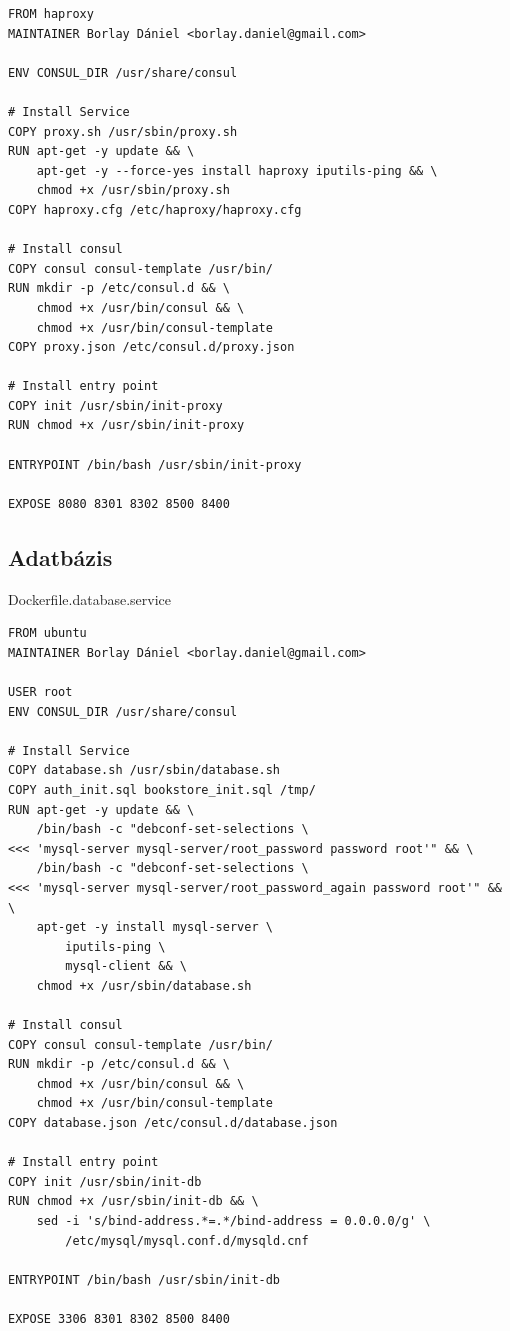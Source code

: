 \documentclass[11pt,magyar,a4paper,twoside,]{report}
\begin{document}
\begin{verbatim}
FROM haproxy
MAINTAINER Borlay Dániel <borlay.daniel@gmail.com>

ENV CONSUL_DIR /usr/share/consul

# Install Service
COPY proxy.sh /usr/sbin/proxy.sh
RUN apt-get -y update && \
    apt-get -y --force-yes install haproxy iputils-ping && \
    chmod +x /usr/sbin/proxy.sh
COPY haproxy.cfg /etc/haproxy/haproxy.cfg

# Install consul
COPY consul consul-template /usr/bin/
RUN mkdir -p /etc/consul.d && \
    chmod +x /usr/bin/consul && \
    chmod +x /usr/bin/consul-template
COPY proxy.json /etc/consul.d/proxy.json

# Install entry point
COPY init /usr/sbin/init-proxy
RUN chmod +x /usr/sbin/init-proxy

ENTRYPOINT /bin/bash /usr/sbin/init-proxy

EXPOSE 8080 8301 8302 8500 8400
\end{verbatim}

\subsection{Adatbázis}\label{adatbuxe1zis}

Dockerfile.database.service

\begin{verbatim}
FROM ubuntu
MAINTAINER Borlay Dániel <borlay.daniel@gmail.com>

USER root
ENV CONSUL_DIR /usr/share/consul

# Install Service
COPY database.sh /usr/sbin/database.sh
COPY auth_init.sql bookstore_init.sql /tmp/
RUN apt-get -y update && \
    /bin/bash -c "debconf-set-selections \
<<< 'mysql-server mysql-server/root_password password root'" && \
    /bin/bash -c "debconf-set-selections \
<<< 'mysql-server mysql-server/root_password_again password root'" && \
    apt-get -y install mysql-server \
        iputils-ping \
        mysql-client && \
    chmod +x /usr/sbin/database.sh

# Install consul
COPY consul consul-template /usr/bin/
RUN mkdir -p /etc/consul.d && \
    chmod +x /usr/bin/consul && \
    chmod +x /usr/bin/consul-template
COPY database.json /etc/consul.d/database.json

# Install entry point
COPY init /usr/sbin/init-db
RUN chmod +x /usr/sbin/init-db && \
    sed -i 's/bind-address.*=.*/bind-address = 0.0.0.0/g' \
        /etc/mysql/mysql.conf.d/mysqld.cnf

ENTRYPOINT /bin/bash /usr/sbin/init-db

EXPOSE 3306 8301 8302 8500 8400
\end{verbatim}
\end{document}
